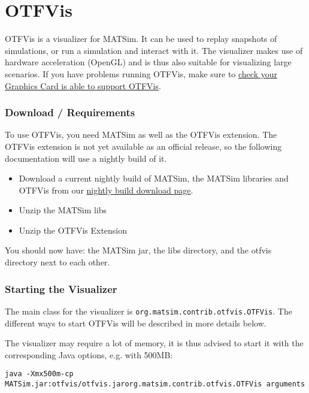 \documentclass[a4paper,11pt]{report}
\begin{document}

\vfill\eject
\section{OTFVis}

OTFVis  is a visualizer for MATSim. It can be used to replay snapshots of  simulations, or run a simulation and interact with it. The visualizer  makes use of hardware acceleration (OpenGL) and is thus also suitable  for visualizing large scenarios. If you have problems running OTFVis,  make sure to \href{http://www.matsim.org/docs/extensions/otfvis/opengl}{check your Graphics Card is able to support OTFVis}.

\subsubsection{Download / Requirements}

To use OTFVis, you need MATSim as well as the OTFVis extension. The  OTFVis extension is not yet available as an official release, so the  following documentation will use a nightly build of it.
\begin{itemize}
	\item Download a current nightly build of MATSim, the MATSim libraries and OTFVis from our \href{http://www.matsim.org/files/builds}{nightly build download page}.
	\item Unzip the MATSim libs
	\item Unzip the OTFVis Extension
\end{itemize}

You should now have: the MATSim jar, the libs directory, and the otfvis directory next to each other.

\subsubsection{Starting the Visualizer}

The main class for the visualizer is 
\texttt{org.matsim.contrib.otfvis.OTFVis}. The different ways to start OTFVis will be described in more details below.

The visualizer may require a lot of memory, it is thus advised to start it with the corresponding Java options, e.g. with 500MB:
\begin{verbatim}
java -Xmx500m-cp MATSim.jar:otfvis/otfvis.jarorg.matsim.contrib.otfvis.OTFVis arguments
\end{verbatim}
\end{document}
